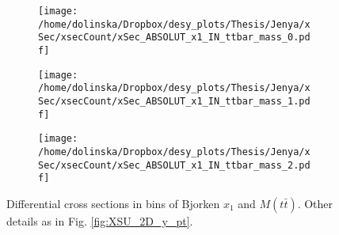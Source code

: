 \begin{figure}[p]
\centering
\begin{subfigure}
  \centering
  \texttt{[image: /home/dolinska/Dropbox/desy\_plots/Thesis/Jenya/xSec/xsecCount/xSec\_ABSOLUT\_x1\_IN\_ttbar\_mass\_0.pdf]}
\end{subfigure}
\begin{subfigure}
  \centering
  \texttt{[image: /home/dolinska/Dropbox/desy\_plots/Thesis/Jenya/xSec/xsecCount/xSec\_ABSOLUT\_x1\_IN\_ttbar\_mass\_1.pdf]}
\end{subfigure}
\begin{subfigure}
  \centering
  \texttt{[image: /home/dolinska/Dropbox/desy\_plots/Thesis/Jenya/xSec/xsecCount/xSec\_ABSOLUT\_x1\_IN\_ttbar\_mass\_2.pdf]}
\end{subfigure}
\caption{Differential cross sections in bins of Bjorken $x_{1}$ and $M(t\bar{t})$. Other details as in Fig. \ref{fig:XSU_2D_y_pt}.}
\label{fig:XSU_2D_x1_Mtt}
\end{figure}

